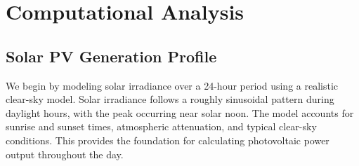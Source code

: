 \documentclass[11pt,a4paper]{article}
\begin{document}
\section{Computational Analysis}

\subsection{Solar PV Generation Profile}

We begin by modeling solar irradiance over a 24-hour period using a realistic clear-sky model.
Solar irradiance follows a roughly sinusoidal pattern during daylight hours, with the peak
occurring near solar noon. The model accounts for sunrise and sunset times, atmospheric
attenuation, and typical clear-sky conditions. This provides the foundation for calculating
photovoltaic power output throughout the day.
\end{document}
